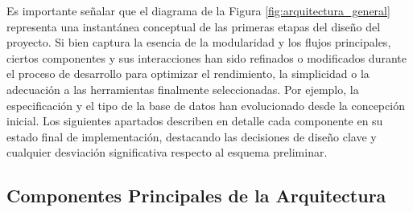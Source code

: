 Es importante señalar que el diagrama de la Figura \ref{fig:arquitectura_general} representa una instantánea conceptual de las primeras etapas del diseño del proyecto. Si bien captura la esencia de la modularidad y los flujos principales, ciertos componentes y sus interacciones han sido refinados o modificados durante el proceso de desarrollo para optimizar el rendimiento, la simplicidad o la adecuación a las herramientas finalmente seleccionadas. Por ejemplo, la especificación y el tipo de la base de datos han evolucionado desde la concepción inicial. Los siguientes apartados describen en detalle cada componente en su estado final de implementación, destacando las decisiones de diseño clave y cualquier desviación significativa respecto al esquema preliminar.

\subsection{Componentes Principales de la Arquitectura}

